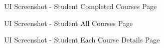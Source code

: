 \begin{figure}[H]
    \centering
    \caption{UI Screenshot - Student Completed Courses Page}
    \label{fig:ss_s_completed_courses}
\end{figure}

\begin{figure}[H]
    \centering
    \caption{UI Screenshot - Student All Courses Page}
    \label{fig:ss_s_all_courses}
\end{figure}

\begin{figure}[H]
    \centering
    \caption{UI Screenshot - Student Each Course Details Page}
    \label{fig:ss_s_each_course}
\end{figure}

